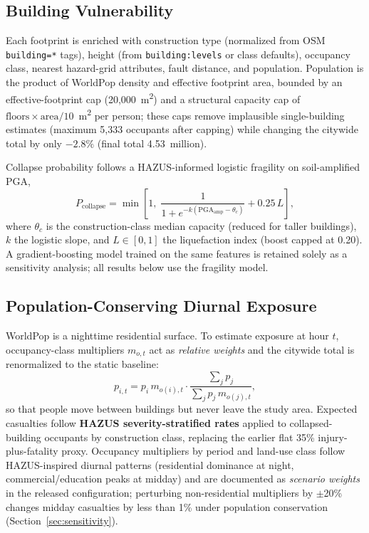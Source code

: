 \documentclass[a4paper,fleqn]{cas-sc}
\begin{document}
\subsection{Building Vulnerability}
\label{sec:buildings}
Each footprint is enriched with construction type (normalized from OSM
\texttt{building=*} tags), height (from \texttt{building:levels} or class
defaults), occupancy class, nearest hazard-grid attributes, fault distance,
and population. Population is the product of WorldPop density and effective
footprint area, bounded by an effective-footprint cap
(20{,}000~m\textsuperscript{2}) and a structural capacity cap of
$\mathrm{floors} \times \mathrm{area} / 10$~m\textsuperscript{2} per person;
these caps remove implausible single-building estimates (maximum 5{,}333
occupants after capping) while changing the citywide total by only $-2.8\%$
(final total 4.53~million).

Collapse probability follows a HAZUS-informed logistic fragility
\cite{hazus} on soil-amplified PGA,
\begin{equation}
P_{\mathrm{collapse}} = \min\!\left[1,\;
\frac{1}{1+e^{-k (\mathrm{PGA_{amp}} - \theta_c)}} + 0.25\,L \right],
\end{equation}
where $\theta_c$ is the construction-class median capacity (reduced for
taller buildings), $k$ the logistic slope, and $L \in [0,1]$ the
liquefaction index (boost capped at 0.20). A gradient-boosting model
trained on the same features is retained solely as a sensitivity analysis;
all results below use the fragility model.

\subsection{Population-Conserving Diurnal Exposure}
\label{sec:diurnal}
WorldPop is a nighttime residential surface. To estimate exposure at hour
$t$, occupancy-class multipliers $m_{o,t}$ act as \textit{relative weights}
and the citywide total is renormalized to the static baseline:
\begin{equation}
p_{i,t} = p_i \, m_{o(i),t} \cdot
\frac{\sum_j p_j}{\sum_j p_j \, m_{o(j),t}},
\end{equation}
so that people move between buildings but never leave the study area.
Expected casualties follow \textbf{HAZUS severity-stratified rates}
\cite{hazus} applied to collapsed-building occupants by construction class,
replacing the earlier flat 35\% injury-plus-fatality proxy. Occupancy
multipliers by period and land-use class follow HAZUS-inspired diurnal
patterns (residential dominance at night, commercial/education peaks at
midday) and are documented as \textit{scenario weights} in the released
configuration; perturbing non-residential multipliers by $\pm$20\% changes
midday casualties by less than 1\% under population conservation
(Section~\ref{sec:sensitivity}).
\end{document}
